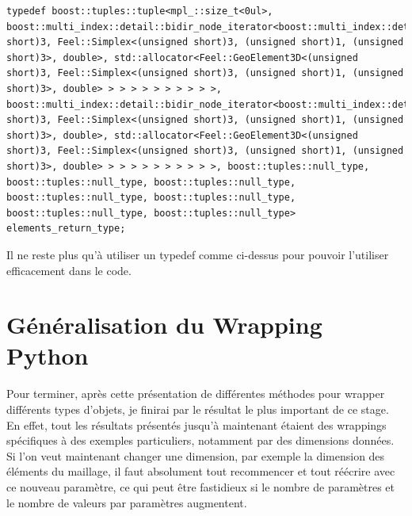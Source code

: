 \documentclass[french,12pt]{article}
\begin{document}
\begin{lstlisting}
typedef boost::tuples::tuple<mpl_::size_t<0ul>, boost::multi_index::detail::bidir_node_iterator<boost::multi_index::detail::ordered_index_node<boost::multi_index::detail::ordered_index_node<boost::multi_index::detail::ordered_index_node<boost::multi_index::detail::ordered_index_node<boost::multi_index::detail::ordered_index_node<boost::multi_index::detail::ordered_index_node<boost::multi_index::detail::ordered_index_node<boost::multi_index::detail::index_node_base<Feel::GeoElement3D<(unsigned short)3, Feel::Simplex<(unsigned short)3, (unsigned short)1, (unsigned short)3>, double>, std::allocator<Feel::GeoElement3D<(unsigned short)3, Feel::Simplex<(unsigned short)3, (unsigned short)1, (unsigned short)3>, double> > > > > > > > > > >, boost::multi_index::detail::bidir_node_iterator<boost::multi_index::detail::ordered_index_node<boost::multi_index::detail::ordered_index_node<boost::multi_index::detail::ordered_index_node<boost::multi_index::detail::ordered_index_node<boost::multi_index::detail::ordered_index_node<boost::multi_index::detail::ordered_index_node<boost::multi_index::detail::ordered_index_node<boost::multi_index::detail::index_node_base<Feel::GeoElement3D<(unsigned short)3, Feel::Simplex<(unsigned short)3, (unsigned short)1, (unsigned short)3>, double>, std::allocator<Feel::GeoElement3D<(unsigned short)3, Feel::Simplex<(unsigned short)3, (unsigned short)1, (unsigned short)3>, double> > > > > > > > > > >, boost::tuples::null_type, boost::tuples::null_type, boost::tuples::null_type, boost::tuples::null_type, boost::tuples::null_type, boost::tuples::null_type, boost::tuples::null_type> elements_return_type; 
\end{lstlisting}

Il ne reste plus qu'à utiliser un typedef comme ci-dessus pour pouvoir l'utiliser efficacement dans le code.

\section{Généralisation du Wrapping Python}

Pour terminer, après cette présentation de différentes méthodes pour wrapper différents types d'objets, je finirai par le résultat le plus important de ce stage.
En effet, tout les résultats présentés jusqu'à maintenant étaient des wrappings spécifiques à des exemples particuliers, notamment par des dimensions données. Si l'on veut maintenant changer une dimension, par exemple la dimension des éléments du maillage, il faut absolument tout recommencer et tout réécrire avec ce nouveau paramètre, ce qui peut être fastidieux si le nombre de paramètres et le nombre de valeurs par paramètres augmentent.
\end{document}
